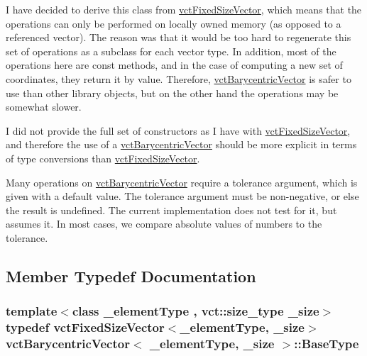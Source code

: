 I have decided to derive this class from \hyperlink{classvct_fixed_size_vector}{vct\+Fixed\+Size\+Vector}, which means that the operations can only be performed on locally owned memory (as opposed to a referenced vector). The reason was that it would be too hard to regenerate this set of operations as a subclass for each vector type. In addition, most of the operations here are const methods, and in the case of computing a new set of coordinates, they return it by value. Therefore, \hyperlink{classvct_barycentric_vector}{vct\+Barycentric\+Vector} is safer to use than other library objects, but on the other hand the operations may be somewhat slower.

I did not provide the full set of constructors as I have with \hyperlink{classvct_fixed_size_vector}{vct\+Fixed\+Size\+Vector}, and therefore the use of a \hyperlink{classvct_barycentric_vector}{vct\+Barycentric\+Vector} should be more explicit in terms of type conversions than \hyperlink{classvct_fixed_size_vector}{vct\+Fixed\+Size\+Vector}.

Many operations on \hyperlink{classvct_barycentric_vector}{vct\+Barycentric\+Vector} require a tolerance argument, which is given with a default value. The tolerance argument must be non-\/negative, or else the result is undefined. The current implementation does not test for it, but assumes it. In most cases, we compare absolute values of numbers to the tolerance. 

\subsection{Member Typedef Documentation}
\hypertarget{classvct_barycentric_vector_aae25bb56b435677441a223ea76745bfd}{}
\subsubsection[{Base\+Type}]{\setlength{\rightskip}{0pt plus 5cm}template$<$class \+\_\+element\+Type , vct\+::size\+\_\+type \+\_\+size$>$ typedef {\bf vct\+Fixed\+Size\+Vector}$<$\+\_\+element\+Type, \+\_\+size$>$ {\bf vct\+Barycentric\+Vector}$<$ \+\_\+element\+Type, \+\_\+size $>$\+::{\bf Base\+Type}}\label{classvct_barycentric_vector_aae25bb56b435677441a223ea76745bfd}
\hypertarget{classvct_barycentric_vector_af89123d5c607a28e2328d5d370dffb33}{}
